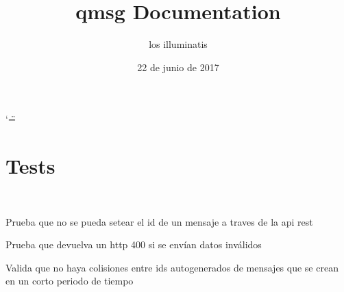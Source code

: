 \documentclass[letterpaper,10pt,spanish]{sphinxmanual}
\title{qmsg Documentation}
\date{22 de junio de 2017}
\author{los illuminatis}
\begin{document}
\ifnum\catcode`\"=\active{}\fi
\maketitle
\sphinxtableofcontents
{}\label{\detokenize{index::doc}}



\chapter{Tests}
\label{\detokenize{modules/tests:tests}}\label{\detokenize{modules/tests:documentacion-de-qmsg}}\label{\detokenize{modules/tests::doc}}

\begin{fulllineitems}
\label{\detokenize{modules/tests:apirestv1.tests.MessageTestCase}}~

\begin{fulllineitems}
\label{\detokenize{modules/tests:apirestv1.tests.MessageTestCase.test_MITM}}
Prueba que no se pueda setear el id de un mensaje a traves de
la api rest

\end{fulllineitems}


\begin{fulllineitems}
\label{\detokenize{modules/tests:apirestv1.tests.MessageTestCase.test_bad_request}}
Prueba que devuelva un http 400 si se envían datos inválidos

\end{fulllineitems}


\begin{fulllineitems}
\label{\detokenize{modules/tests:apirestv1.tests.MessageTestCase.test_collisions}}
Valida que no haya colisiones entre ids autogenerados de
mensajes que se crean en un corto periodo de tiempo

\end{fulllineitems}


\end{fulllineitems}
\end{document}
